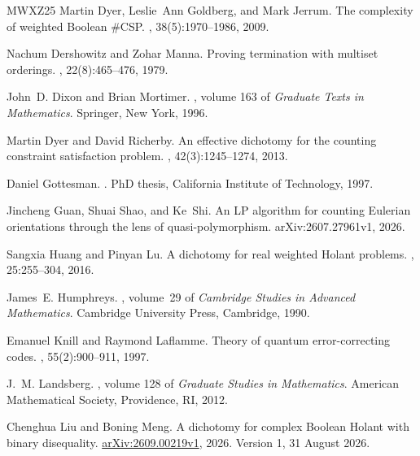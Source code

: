 \documentclass[11pt,letterpaper,onecolumn]{article}
\theoremstyle{plain}
\theoremstyle{definition}
\theoremstyle{remark}
\begin{document}
\begin{thebibliography}{MWXZ25}
Martin Dyer, Leslie~Ann Goldberg, and Mark Jerrum.
\newblock The complexity of weighted {Boolean} {{\#CSP}}.
, 38(5):1970--1986, 2009.

Nachum Dershowitz and Zohar Manna.
\newblock Proving termination with multiset orderings.
, 22(8):465--476, 1979.

John~D. Dixon and Brian Mortimer.
, volume 163 of {\em Graduate Texts in
  Mathematics}.
\newblock Springer, New York, 1996.

Martin Dyer and David Richerby.
\newblock An effective dichotomy for the counting constraint satisfaction
  problem.
, 42(3):1245--1274, 2013.

Daniel Gottesman.
.
\newblock PhD thesis, California Institute of Technology, 1997.

Jincheng Guan, Shuai Shao, and Ke~Shi.
\newblock An {LP} algorithm for counting {Eulerian} orientations through the
  lens of quasi-polymorphism.
\newblock arXiv:2607.27961v1, 2026.

Sangxia Huang and Pinyan Lu.
\newblock A dichotomy for real weighted {Holant} problems.
, 25:255--304, 2016.

James~E. Humphreys.
, volume~29 of {\em
  Cambridge Studies in Advanced Mathematics}.
\newblock Cambridge University Press, Cambridge, 1990.

Emanuel Knill and Raymond Laflamme.
\newblock Theory of quantum error-correcting codes.
, 55(2):900--911, 1997.

J.~M. Landsberg.
, volume 128 of {\em Graduate
  Studies in Mathematics}.
\newblock American Mathematical Society, Providence, RI, 2012.

Chenghua Liu and Boning Meng.
\newblock A dichotomy for complex {Boolean} {Holant} with binary disequality.
\newblock \href{https://arxiv.org/abs/2609.00219v1}{arXiv:2609.00219v1}, 2026.
\newblock Version 1, 31 August 2026.


\end{thebibliography}
\end{document}
